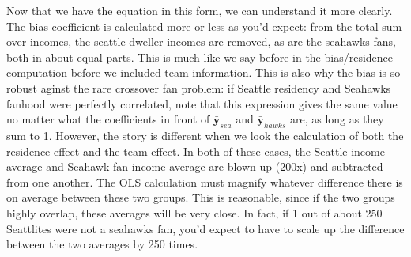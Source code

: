 Now that we have the equation in this form, we can understand it more clearly.
The bias coefficient is calculated more or less as you'd expect: from the total
sum over incomes, the seattle-dweller incomes are removed, as are the seahawks
fans, both in about equal parts.  This is much like we say before in the
bias/residence computation before we included team information.  This is also
why the bias is so robust aginst the rare crossover fan problem: if Seattle
residency and Seahawks fanhood were perfectly correlated, note that this
expression gives the same value no matter what the coefficients in front of
$\mathbf{\bar{y}}_\mathit{sea}$ and $\mathbf{\bar{y}}_\mathit{hawks}$ are, as long
as they sum to 1.  However, the story is different when we look the calculation
of both the residence effect and the team effect.  In both of these cases, the
Seattle income average and Seahawk fan income average are blown up (200x) and
subtracted from one another.  The OLS calculation must magnify whatever
difference there is on average between these two groups. This is reasonable,
since if the two groups highly overlap, these averages will be very close.  In
fact, if 1 out of about 250 Seattlites were not a seahawks fan, you'd expect to
have to scale up the difference between the two averages by 250 times.


